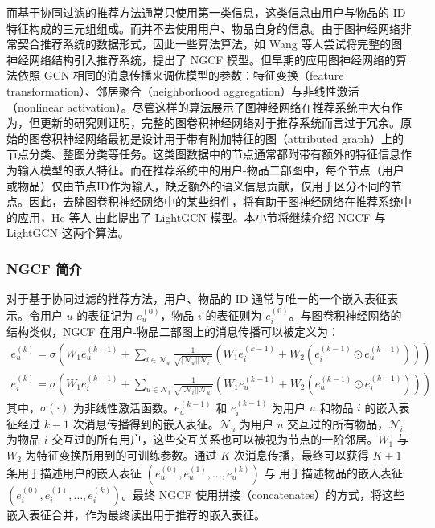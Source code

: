 而基于协同过滤的推荐方法通常只使用第一类信息，这类信息由用户与物品的 ID 特征构成的三元组组成。而并不去使用用户、物品自身的信息。由于图神经网络非常契合推荐系统的数据形式，因此一些算法算法，如 Wang 等人\cite{wang_neural_2019}尝试将完整的图神经网络结构引入推荐系统，提出了 NGCF 模型。但早期的应用图神经网络的算法依照 GCN 相同的消息传播来调优模型的参数：特征变换（feature transformation）、邻居聚合（neighborhood aggregation）与非线性激活（nonlinear activation）。尽管这样的算法展示了图神经网络在推荐系统中大有作为，但更新的研究则证明，完整的图卷积神经网络对于推荐系统而言过于冗余\cite{he_lightgcn_2020}。原始的图卷积神经网络最初是设计用于带有附加特征的图（attributed graph）上的节点分类、整图分类等任务。这类图数据中的节点通常都附带有额外的特征信息作为输入模型的嵌入特征。而在推荐系统中的用户-物品二部图中，每个节点（用户或物品）仅由节点ID作为输入，缺乏额外的语义信息贡献，仅用于区分不同的节点。因此，去除图卷积神经网络中的某些组件，将有助于图神经网络在推荐系统中的应用，He 等人\cite{he_lightgcn_2020} 由此提出了 LightGCN 模型。本小节将继续介绍 NGCF 与 LightGCN 这两个算法。

\subsubsection{NGCF 简介}
对于基于协同过滤的推荐方法，用户、物品的 ID 通常与唯一的一个嵌入表征表示。令用户 $u$ 的表征记为 $e_u^{(0)}$，物品 $i$ 的表征则为 $e_i^{(0)}$。与图卷积神经网络的结构类似，NGCF 在用户-物品二部图上的消息传播可以被定义为：
\begin{equation}
    \begin{aligned}
        e_u^{(k)} = \sigma (W_1 e_u^{(k-1)} + \sum_{i\in\mathcal{N}_u} \frac{1}{\sqrt{|\mathcal{N}_u||\mathcal{N}_i|}}(W_1e_i^{(k-1)} + W_2(e_i^{(k-1)} \odot e_u^{(k-1)} ))) \\
        e_i^{(k)} = \sigma (W_1 e_i^{(k-1)} + \sum_{u\in\mathcal{N}_i} \frac{1}{\sqrt{|\mathcal{N}_i||\mathcal{N}_u|}}(W_1e_u^{(k-1)} + W_2(e_u^{(k-1)} \odot e_i^{(k-1)} )))
    \end{aligned}
\end{equation}
其中，$\sigma(\cdot)$ 为非线性激活函数。$e_u^{(k-1)}$ 和 $e_i^{(k-1)}$ 为用户 $u$ 和物品 $i$ 的嵌入表征经过 $k-1$ 次消息传播得到的嵌入表征。$\mathcal{N}_u$ 为用户 $u$ 交互过的所有物品，$\mathcal{N}_i$ 为物品 $i$ 交互过的所有用户，这些交互关系也可以被视为节点的一阶邻居。$W_1$ 与 $W_2$ 为特征变换所用到的可训练参数。通过 $K$ 次消息传播，最终可以获得 $K+1$ 条用于描述用户的嵌入表征 $(e_u^{(0)},e_u^{(1)},\dots,e_u^{(k)})$ 与 用于描述物品的嵌入表征 $(e_i^{(0)},e_i^{(1)},\dots,e_i^{(k)})$。最终 NGCF 使用拼接（concatenates）的方式，将这些嵌入表征合并，作为最终读出用于推荐的嵌入表征。

